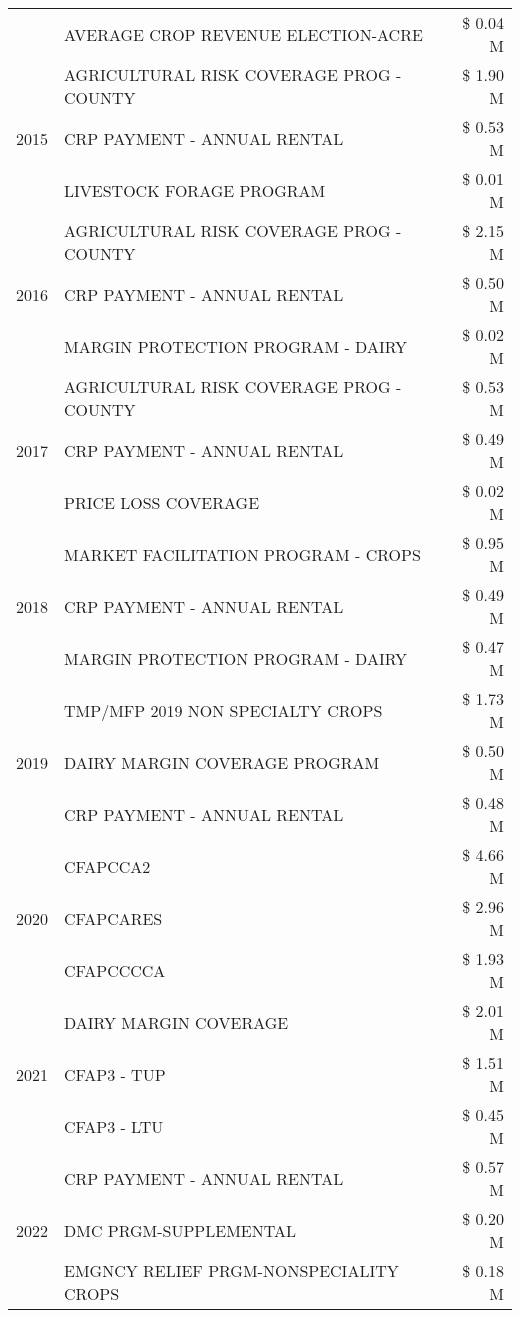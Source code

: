 \begin{tabular}{llr}
 & AVERAGE CROP REVENUE ELECTION-ACRE & \$ 0.04 M \\
\cline{1-3}
\multirow[t]{3}{*}{2015} & AGRICULTURAL RISK COVERAGE PROG - COUNTY & \$ 1.90 M \\
 & CRP PAYMENT - ANNUAL RENTAL & \$ 0.53 M \\
 & LIVESTOCK FORAGE PROGRAM & \$ 0.01 M \\
\cline{1-3}
\multirow[t]{3}{*}{2016} & AGRICULTURAL RISK COVERAGE PROG - COUNTY & \$ 2.15 M \\
 & CRP PAYMENT - ANNUAL RENTAL & \$ 0.50 M \\
 & MARGIN PROTECTION PROGRAM - DAIRY & \$ 0.02 M \\
\cline{1-3}
\multirow[t]{3}{*}{2017} & AGRICULTURAL RISK COVERAGE PROG - COUNTY & \$ 0.53 M \\
 & CRP PAYMENT - ANNUAL RENTAL & \$ 0.49 M \\
 & PRICE LOSS COVERAGE & \$ 0.02 M \\
\cline{1-3}
\multirow[t]{3}{*}{2018} & MARKET FACILITATION PROGRAM - CROPS & \$ 0.95 M \\
 & CRP PAYMENT - ANNUAL RENTAL & \$ 0.49 M \\
 & MARGIN PROTECTION PROGRAM - DAIRY & \$ 0.47 M \\
\cline{1-3}
\multirow[t]{3}{*}{2019} & TMP/MFP 2019 NON SPECIALTY CROPS & \$ 1.73 M \\
 & DAIRY MARGIN COVERAGE PROGRAM & \$ 0.50 M \\
 & CRP PAYMENT - ANNUAL RENTAL & \$ 0.48 M \\
\cline{1-3}
\multirow[t]{3}{*}{2020} & CFAPCCA2 & \$ 4.66 M \\
 & CFAPCARES & \$ 2.96 M \\
 & CFAPCCCCA & \$ 1.93 M \\
\cline{1-3}
\multirow[t]{3}{*}{2021} & DAIRY MARGIN COVERAGE & \$ 2.01 M \\
 & CFAP3 - TUP & \$ 1.51 M \\
 & CFAP3 - LTU & \$ 0.45 M \\
\cline{1-3}
\multirow[t]{3}{*}{2022} & CRP PAYMENT - ANNUAL RENTAL & \$ 0.57 M \\
 & DMC PRGM-SUPPLEMENTAL & \$ 0.20 M \\
 & EMGNCY RELIEF PRGM-NONSPECIALITY CROPS & \$ 0.18 M \\
\cline{1-3}
\bottomrule
\end{tabular}

